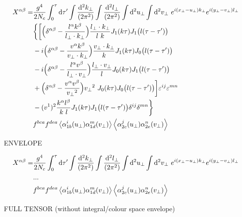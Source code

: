 \begin{equation*}
\begin{split}
 X^{\alpha \beta} = &
\frac{g^4}{2 N_c}
\int_0^\tau \mathop{}\!\mathrm{d} \tau'
\int \frac{\mathop{}\!\mathrm{d}^2 k_\perp}{(2\pi^2)}
\int \frac{\mathop{}\!\mathrm{d}^2 l_\perp}{(2\pi^2)}
\int \mathop{}\!\mathrm{d}^2 u_\perp
\int \mathop{}\!\mathrm{d}^2 v_\perp ~
e^{i (x_\perp - u_\perp) k_\perp}
e^{i (y_\perp - v_\perp) l_\perp} \\
& \bigg\{ \bigg[ \Big(\delta^{\alpha \beta}  - \frac{l^\alpha k^\beta}{l_\perp \cdot k_\perp}\Big) \frac{l_\perp \cdot k_\perp}{l ~k} J_1 (k \tau) J_1\big(l(\tau-\tau')\big) \\
& -i \Big(\delta^{\alpha \beta}  - \frac{v^\alpha k^\beta}{v_\perp \cdot k_\perp}\Big) \frac{v_\perp \cdot k_\perp}{k} J_1 (k \tau) J_0\big(l(\tau-\tau')\big) \\
& -i \Big(\delta^{\alpha \beta}  - \frac{l^\alpha v^\beta}{l_\perp \cdot v_\perp}\Big) \frac{l_\perp \cdot v_\perp}{l} J_0 (k \tau) J_1\big(l(\tau-\tau')\big) \\
& + \Big(\delta^{\alpha \beta}  - \frac{v^\alpha v^\beta}{{v_\perp}^2}\Big) {v_\perp}^2 ~ J_0 (k \tau) J_0\big(l(\tau-\tau')\big) \bigg] \varepsilon^{ij} \varepsilon^{mn} \\ 
& -(v^1)^2 \frac{k^\alpha l^\beta}{k ~l} J_1 (k \tau) J_1\big(l(\tau-\tau')\big) \delta^{ij} \delta^{mn} \bigg\} \\
&  f^{bca} f^{dea}
\left< \alpha^i_{1b} (u_\perp) \alpha^m_{1d} (v_\perp) \right>  \left< \alpha^j_{2c} (u_\perp) \alpha^n_{2e} (v_\perp) \right>
\end{split}
\end{equation*}

\newpage
ENVELOPE

\begin{equation*}
\begin{split}
 X^{\alpha \beta} = &
\frac{g^4}{2 N_c}
\int_0^\tau \mathop{}\!\mathrm{d} \tau'
\int \frac{\mathop{}\!\mathrm{d}^2 k_\perp}{(2\pi^2)}
\int \frac{\mathop{}\!\mathrm{d}^2 l_\perp}{(2\pi^2)}
\int \mathop{}\!\mathrm{d}^2 u_\perp
\int \mathop{}\!\mathrm{d}^2 v_\perp ~
e^{i (x_\perp - u_\perp) k_\perp}
e^{i (y_\perp - v_\perp) l_\perp} \\
& ... \\
&  f^{bca} f^{dea}
\left< \alpha^i_{1b} (u_\perp) \alpha^m_{1d} (v_\perp) \right>  \left< \alpha^j_{2c} (u_\perp) \alpha^n_{2e} (v_\perp) \right>
\end{split}
\end{equation*}


\newpage 

FULL TENSOR (without integral/colour space envelope)

